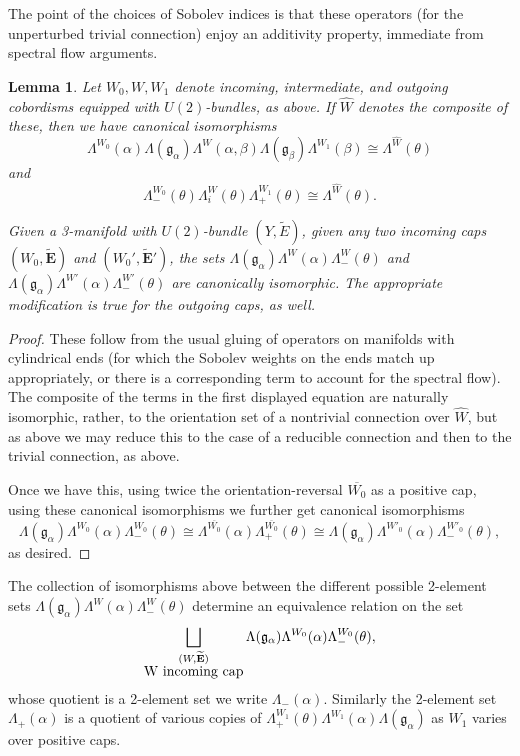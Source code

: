 \documentclass[10pt,a4paper]{amsart}
\newtheorem{lemma}[theorem]{Lemma}
\theoremstyle{definition}
\theoremstyle{remark}
\numberwithin{figure}{qchap}
\begin{document}
The point of the choices of Sobolev indices is that these operators (for the unperturbed trivial connection) enjoy an additivity property, immediate from spectral flow arguments.

\begin{lemma}Let $W_0, W, W_1$ denote incoming, intermediate, and outgoing cobordisms equipped with $U(2)$-bundles, as above. If $\hat W$ denotes the composite of these, then we have canonical isomorphisms $$\Lambda^{W_0}(\alpha) \Lambda(\mathfrak g_\alpha) \Lambda^W(\alpha, \beta) \Lambda(\mathfrak g_\beta) \Lambda^{W_1}(\beta) \cong \Lambda^{\hat W}(\theta)$$ and $$\Lambda^{W_0}_-(\theta) \Lambda^W_i(\theta) \Lambda^{W_1}_+(\theta) \cong \Lambda^{\hat W}(\theta).$$

Given a 3-manifold with $U(2)$-bundle $(Y, \tilde E)$, given any two incoming caps $(W_0, \widetilde{\mathbf{E}})$ and $(W_0', \widetilde{\mathbf{E}}')$, the sets $\Lambda(\mathfrak g_\alpha) \Lambda^W(\alpha) \Lambda^W_-(\theta)$ and $\Lambda(\mathfrak g_\alpha) \Lambda^{W'}(\alpha) \Lambda^{W'}_-(\theta)$ are canonically isomorphic. The appropriate modification is true for the outgoing caps, as well.
\end{lemma}
\begin{proof}These follow from the usual gluing of operators on manifolds with cylindrical ends (for which the Sobolev weights on the ends match up appropriately, or there is a corresponding term to account for the spectral flow). The composite of the terms in the first displayed equation are naturally isomorphic, rather, to the orientation set of a nontrivial connection over $\hat W$, but as above we may reduce this to the case of a reducible connection and then to the trivial connection, as above.

Once we have this, using twice the orientation-reversal $\overline{W_0}$ as a positive cap, using these canonical isomorphisms we further get canonical isomorphisms $$\Lambda(\mathfrak g_\alpha) \Lambda^{W_0}(\alpha) \Lambda^{W_0}_-(\theta) \cong \Lambda^{\overline{W_0}}(\alpha)  \Lambda^{\overline{W_0}}_+(\theta) \cong \Lambda(\mathfrak g_\alpha) \Lambda^{W'_0}(\alpha) \Lambda^{W'_0}_-(\theta),$$ as desired.
\end{proof}

The collection of isomorphisms above between the different possible 2-element sets $\Lambda(\mathfrak g_\alpha) \Lambda^W(\alpha) \Lambda^W_-(\theta)$ determine an equivalence relation on the set $$\bigsqcup_{\substack{(W, \widetilde{\mathbf{E}})\\ $W$ \text{ incoming cap}}} \Lambda(\mathfrak g_\alpha) \Lambda^{W_0}(\alpha) \Lambda^{W_0}_-(\theta),$$ whose quotient is a 2-element set we write $\Lambda_-(\alpha)$. Similarly the 2-element set $\Lambda_+(\alpha)$ is a quotient of various copies of $\Lambda^{W_1}_+(\theta)\Lambda^{W_1}(\alpha)\Lambda(\mathfrak g_\alpha)$ as $W_1$ varies over positive caps.
\end{document}
